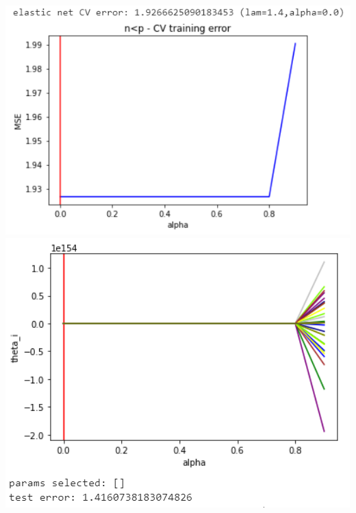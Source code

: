 \documentclass[11pt]{article}
\begin{document}
\begin{center}
\includegraphics[scale=0.7]{charts/en_corr_n_lt_p_err.PNG}
\includegraphics[scale=0.7]{charts/en_corr_n_lt_p_thetas.PNG}


\end{center}
\end{document}
